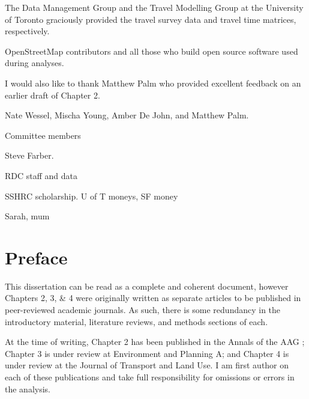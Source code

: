 \documentclass[11 pt, letterpaper]{report}
\begin{document}
The Data Management Group and the Travel Modelling Group at the University of Toronto graciously provided the travel survey data and travel time matrices, respectively. 

OpenStreetMap contributors and all those who build open source software used during analyses.

I would also like to thank Matthew Palm who provided excellent feedback on an earlier draft of Chapter 2.

Nate Wessel, Mischa Young, Amber De John, and Matthew Palm. 

Committee members

Steve Farber.

RDC staff and data

SSHRC scholarship. U of T moneys, SF money

Sarah, mum


\newpage





\tableofcontents


\newpage







\listoffigures

\newpage



\listoftables



\newpage


\chapter*{Preface}


This dissertation can be read as a complete and coherent document, however Chapters 2, 3, \& 4 were originally written as separate articles to be published in peer-reviewed academic journals. As such, there is some redundancy in the introductory material, literature reviews, and methods sections of each. 

At the time of writing, Chapter 2 has been published in the Annals of the AAG \cite{allen_suburbanization_2021}; Chapter 3 is under review at Environment and Planning A; and Chapter 4 is under review at the Journal of Transport and Land Use. I am first author on each of these publications and take full responsibility for omissions or errors in the analysis. 
\end{document}
